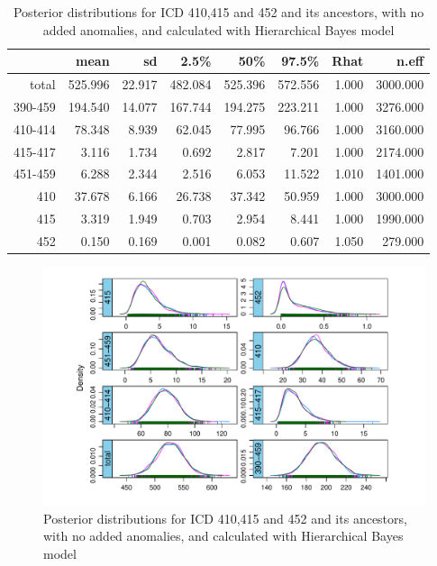 \newpage

\begin{table}[!t]
	\centering
	\begin{tabular}{rrrrrrrr}
		\hline
		& mean & sd & 2.5\% & 50\% & 97.5\% & Rhat & n.eff \\ 
		\hline
		total & 525.996 & 22.917 & 482.084 & 525.396 & 572.556 & 1.000 & 3000.000 \\ 
		390-459 & 194.540 & 14.077 & 167.744 & 194.275 & 223.211 & 1.000 & 3276.000 \\ 
		410-414 & 78.348 & 8.939 & 62.045 & 77.995 & 96.766 & 1.000 & 3160.000 \\ 
		415-417 & 3.116 & 1.734 & 0.692 & 2.817 & 7.201 & 1.000 & 2174.000 \\ 
		451-459 & 6.288 & 2.344 & 2.516 & 6.053 & 11.522 & 1.010 & 1401.000 \\ 
		410 & 37.678 & 6.166 & 26.738 & 37.342 & 50.959 & 1.000 & 3000.000 \\ 
		415 & 3.319 & 1.949 & 0.703 & 2.954 & 8.441 & 1.000 & 1990.000 \\ 
		452 & 0.150 & 0.169 & 0.001 & 0.082 & 0.607 & 1.050 & 279.000 \\ 
		\hline
	\end{tabular}
	\caption{Posterior distributions for ICD 410,415 and 452 and its ancestors, with no added anomalies, and calculated with Hierarchical Bayes model} 
	\label{tab:postsumnormh.mimic}
\end{table}

\begin{figure}[!h]
	\centering
	\includegraphics[width=1\linewidth]{../../R-codes/JAGS/plots/mimic/Densitynorm}
	\caption{Posterior distributions for ICD 410,415 and 452 and its ancestors, with no added anomalies, and calculated with Hierarchical Bayes model}
	\label{fig:densitynormh}
\end{figure}

